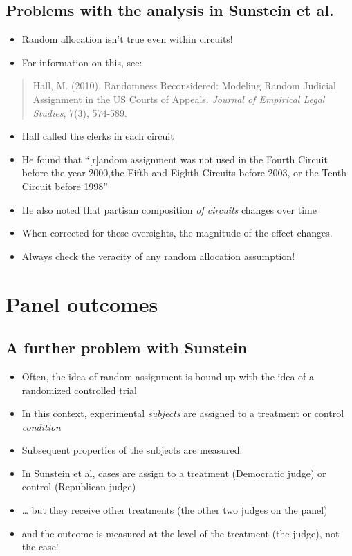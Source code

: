 \documentclass[12pt,twoside]{article}
\providecommand{\tightlist}{%
  \setlength{\itemsep}{0pt}\setlength{\parskip}{0pt}}
\begin{document}
\subsection{Problems with the analysis in Sunstein et
al.}\label{problems-with-the-analysis-in-sunstein-et-al.}

\begin{itemize}
\tightlist
\item
  Random allocation isn't true even within circuits!
\item
  For information on this, see:
\end{itemize}

\begin{quote}
Hall, M. (2010). Randomness Reconsidered: Modeling Random Judicial
Assignment in the US Courts of Appeals. \emph{Journal of Empirical Legal
Studies}, 7(3), 574-589.
\end{quote}

\begin{itemize}
\tightlist
\item
  Hall called the clerks in each circuit
\item
  He found that ``{[}r{]}andom assignment was not used in the Fourth
  Circuit before the year 2000,the Fifth and Eighth Circuits before
  2003, or the Tenth Circuit before 1998''
\item
  He also noted that partisan composition \emph{of circuits} changes
  over time
\item
  When corrected for these oversights, the magnitude of the effect
  changes.
\item
  Always check the veracity of any random allocation assumption!
\end{itemize}

\section{Panel outcomes}\label{panel-outcomes}

\subsection{A further problem with
Sunstein}\label{a-further-problem-with-sunstein}

\begin{itemize}
\tightlist
\item
  Often, the idea of random assignment is bound up with the idea of a
  randomized controlled trial
\item
  In this context, experimental \emph{subjects} are assigned to a
  treatment or control \emph{condition}
\item
  Subsequent properties of the subjects are measured.
\item
  In Sunstein et al, cases are assign to a treatment (Democratic judge)
  or control (Republican judge)
\item
  \ldots{} but they receive other treatments (the other two judges on
  the panel)
\item
  and the outcome is measured at the level of the treatment (the judge),
  not the case!
\end{itemize}
\end{document}
